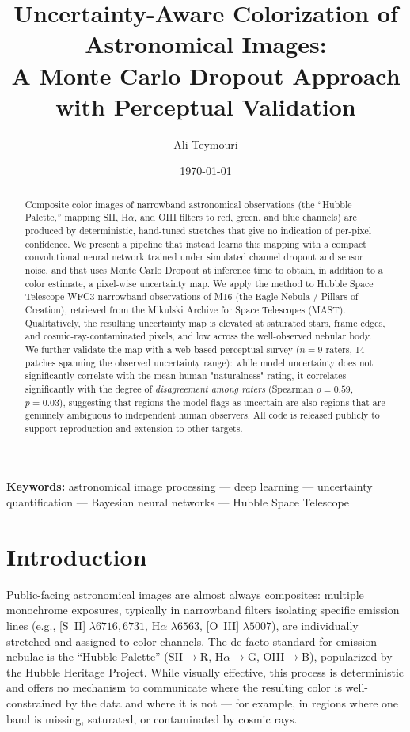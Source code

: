 \documentclass[12pt]{article}
\title{\textbf{Uncertainty-Aware Colorization of Astronomical Images:\\
A Monte Carlo Dropout Approach with Perceptual Validation}}
\author[1]{Ali Teymouri}
\affil[1]{Independent Researcher}
\date{\today}
\begin{document}
\maketitle

\begin{abstract}
Composite color images of narrowband astronomical observations (the
``Hubble Palette,'' mapping SII, H$\alpha$, and OIII filters to red, green,
and blue channels) are produced by deterministic, hand-tuned stretches that
give no indication of per-pixel confidence. We present a pipeline that
instead learns this mapping with a compact convolutional neural network
trained under simulated channel dropout and sensor noise, and that uses
Monte Carlo Dropout at inference time to obtain, in addition to a color
estimate, a pixel-wise uncertainty map. We apply the method to Hubble Space
Telescope WFC3 narrowband observations of M16 (the Eagle Nebula / Pillars of
Creation), retrieved from the Mikulski Archive for Space Telescopes (MAST).
Qualitatively, the resulting uncertainty map is elevated at saturated stars,
frame edges, and cosmic-ray-contaminated pixels, and low across the
well-observed nebular body. We further validate the map with a web-based
perceptual survey ($n=9$ raters, 14 patches spanning the observed
uncertainty range): while model uncertainty does not significantly
correlate with the mean human "naturalness" rating, it correlates
significantly with the degree of \emph{disagreement among raters}
(Spearman $\rho=0.59$, $p=0.03$), suggesting that regions the model flags
as uncertain are also regions that are genuinely ambiguous to independent
human observers. All code is released publicly to support reproduction and
extension to other targets.
\end{abstract}

\noindent\textbf{Keywords:} astronomical image processing --- deep learning ---
uncertainty quantification --- Bayesian neural networks --- Hubble Space Telescope

\section{Introduction}

Public-facing astronomical images are almost always composites: multiple
monochrome exposures, typically in narrowband filters isolating specific
emission lines (e.g., [S~II] $\lambda6716,6731$, H$\alpha$ $\lambda6563$,
[O~III] $\lambda5007$), are individually stretched and assigned to color
channels. The de facto standard for emission nebulae is the ``Hubble
Palette'' (SII$\to$R, H$\alpha\to$G, OIII$\to$B), popularized by the Hubble
Heritage Project. While visually effective, this process is deterministic
and offers no mechanism to communicate where the resulting color is
well-constrained by the data and where it is not --- for example, in regions
where one band is missing, saturated, or contaminated by cosmic rays.
\end{document}
